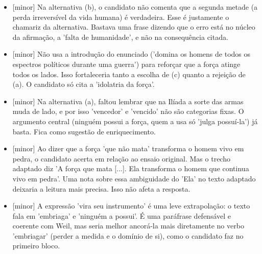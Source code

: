\documentclass{article}%
\begin{document}
\begin{itemize}%
\item%
{[}minor{]} Na alternativa (b), o candidato não comenta que a segunda metade (a perda irreversível da vida humana) é verdadeira. Esse é justamente o chamariz da alternativa. Bastava uma frase dizendo que o erro está no núcleo da afirmação, a 'falta de humanidade', e não na consequência citada.%
\item%
{[}minor{]} Não usa a introdução do enunciado ('domina os homens de todos os espectros políticos durante uma guerra') para reforçar que a força atinge todos os lados. Isso fortaleceria tanto a escolha de (c) quanto a rejeição de (a). O candidato só cita a 'idolatria da força'.%
\item%
{[}minor{]} Na alternativa (a), faltou lembrar que na Ilíada a sorte das armas muda de lado, e por isso 'vencedor' e 'vencido' não são categorias fixas. O argumento central (ninguém possui a força, quem a usa só 'julga possuí{-}la') já basta. Fica como sugestão de enriquecimento.%
\item%
{[}minor{]} Ao dizer que a força 'que não mata' transforma o homem vivo em pedra, o candidato acerta em relação ao ensaio original. Mas o trecho adaptado diz 'A força que mata {[}...{]}. Ela transforma o homem que continua vivo em pedra'. Uma nota sobre essa ambiguidade do 'Ela' no texto adaptado deixaria a leitura mais precisa. Isso não afeta a resposta.%
\item%
{[}minor{]} A expressão 'vira seu instrumento' é uma leve extrapolação: o texto fala em 'embriaga' e 'ninguém a possui'. É uma paráfrase defensável e coerente com Weil, mas seria melhor ancorá{-}la mais diretamente no verbo 'embriagar' (perder a medida e o domínio de si), como o candidato faz no primeiro bloco.%
\end{itemize}%
\end{document}
